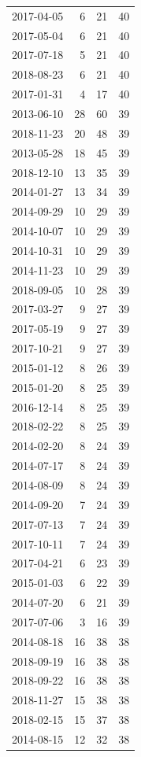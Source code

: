 \begin{tabular}{lrrr}
2017-04-05 & 6 & 21 & 40 \\
2017-05-04 & 6 & 21 & 40 \\
2017-07-18 & 5 & 21 & 40 \\
2018-08-23 & 6 & 21 & 40 \\
2017-01-31 & 4 & 17 & 40 \\
2013-06-10 & 28 & 60 & 39 \\
2018-11-23 & 20 & 48 & 39 \\
2013-05-28 & 18 & 45 & 39 \\
2018-12-10 & 13 & 35 & 39 \\
2014-01-27 & 13 & 34 & 39 \\
2014-09-29 & 10 & 29 & 39 \\
2014-10-07 & 10 & 29 & 39 \\
2014-10-31 & 10 & 29 & 39 \\
2014-11-23 & 10 & 29 & 39 \\
2018-09-05 & 10 & 28 & 39 \\
2017-03-27 & 9 & 27 & 39 \\
2017-05-19 & 9 & 27 & 39 \\
2017-10-21 & 9 & 27 & 39 \\
2015-01-12 & 8 & 26 & 39 \\
2015-01-20 & 8 & 25 & 39 \\
2016-12-14 & 8 & 25 & 39 \\
2018-02-22 & 8 & 25 & 39 \\
2014-02-20 & 8 & 24 & 39 \\
2014-07-17 & 8 & 24 & 39 \\
2014-08-09 & 8 & 24 & 39 \\
2014-09-20 & 7 & 24 & 39 \\
2017-07-13 & 7 & 24 & 39 \\
2017-10-11 & 7 & 24 & 39 \\
2017-04-21 & 6 & 23 & 39 \\
2015-01-03 & 6 & 22 & 39 \\
2014-07-20 & 6 & 21 & 39 \\
2017-07-06 & 3 & 16 & 39 \\
2014-08-18 & 16 & 38 & 38 \\
2018-09-19 & 16 & 38 & 38 \\
2018-09-22 & 16 & 38 & 38 \\
2018-11-27 & 15 & 38 & 38 \\
2018-02-15 & 15 & 37 & 38 \\
2014-08-15 & 12 & 32 & 38 \\

\end{tabular}
